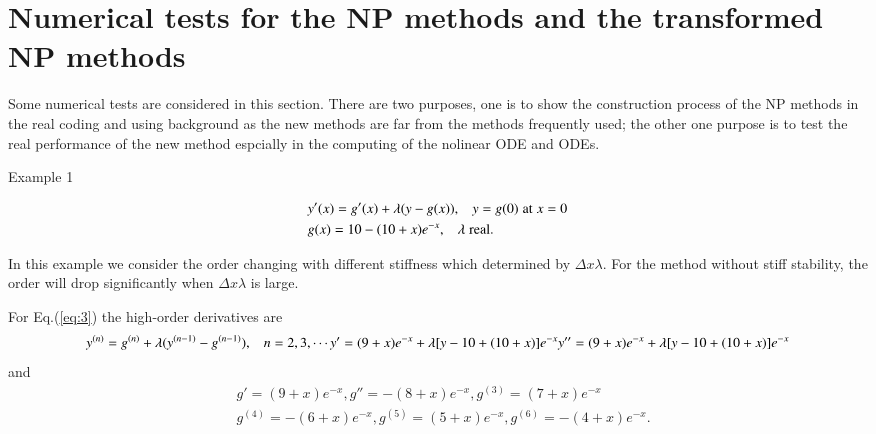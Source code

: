 \documentclass[review]{elsarticle}
\theoremstyle{plain}\newtheorem{definition}{\sc{Definition}}
\theoremstyle{defination}\newtheorem{example}{Example}[section]
\numberwithin{equation}{section}
\numberwithin{table}{section}
\begin{document}
\section{Numerical tests for the NP methods and the transformed NP methods}
Some numerical tests are considered in this section. There are two purposes, one is to show the construction process of the NP methods in  the real coding and using background as the new methods are far from the methods frequently used; the other one purpose is to test the real performance of the new method espcially in the  computing of the nolinear ODE and ODEs.

Example 1 \cite{Seinfeld1970Review,Prothero1974On}

\begin{equation} \label{eq:3}
  \begin{aligned}
	&y'(x)=g'(x)+\lambda (y-g(x)), \hspace{0.3cm} y=g(0) \hspace{0.1cm}  \text{at} \hspace{0.1cm} x=0\\
	&g(x)=10-(10+x)e^{-x},  \hspace{0.3cm} \lambda \hspace{0.1cm} \text{real}.
  \end{aligned}
  \end{equation}

  In this example we consider the order changing  with different stiffness which determined  by $\Delta x \lambda$. For the method without stiff stability, the order will drop significantly when $\Delta x \lambda$ is large. 

  For Eq.(\ref{eq:3}) the high-order derivatives are
\begin{equation}
  y^{(n)}=g^{(n)}+\lambda (y^{(n-1)}-g^{(n-1)}) , \hspace{0.3cm} n=2,3,\cdots
  y'=(9+x)e^{-x}+\lambda [y-10+(10+x)]e^{-x}\\
  y''=(9+x)e^{-x}+\lambda [y-10+(10+x)]e^{-x}\\
\end{equation}
and
\begin{equation}
  \begin{aligned}
  &g'=(9+x)e^{-x},
  g''=-(8+x)e^{-x},
  g^{(3)}=(7+x)e^{-x}\\
  &g^{(4)}=-(6+x)e^{-x},
  g^{(5)}=(5+x)e^{-x},
  g^{(6)}=-(4+x)e^{-x}.\\
  \end{aligned}
  \end{equation}
\end{document}
